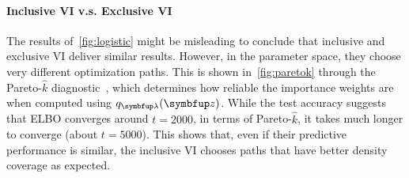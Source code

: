 \vspace{-0.1in}
\paragraph{Inclusive VI v.s. Exclusive VI}
The results of~\cref{fig:logistic} might be misleading to conclude that inclusive and exclusive VI deliver similar results.
However, in the parameter space, they choose very different optimization paths.
This is shown in~\cref{fig:paretok} through the Pareto-\(\widehat{k}\) diagnostic~\citep{NEURIPS2020_7cac11e2, vehtari_pareto_2021}, which determines how reliable the importance weights are when computed using \(q_{\vlambda}(\vz)\).
While the test accuracy suggests that ELBO converges around \(t=2000\), in terms of Pareto-\(\widehat{k}\), it takes much longer to converge (about \(t=5000\)).
This shows that, even if their predictive performance is similar, the inclusive VI chooses paths that have better density coverage as expected.

